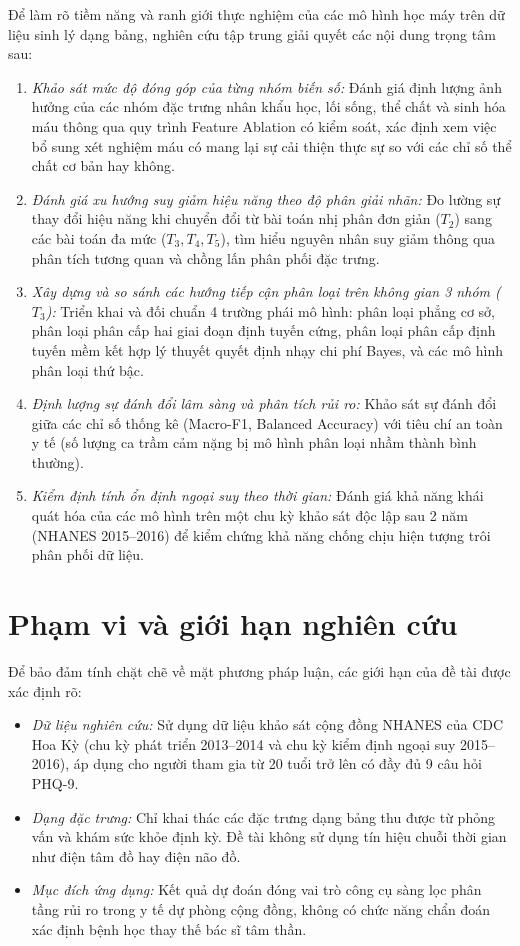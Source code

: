 Để làm rõ tiềm năng và ranh giới thực nghiệm của các mô hình học máy trên dữ liệu sinh lý dạng bảng, nghiên cứu tập trung giải quyết các nội dung trọng tâm sau:
\begin{enumerate}
    \item \textit{Khảo sát mức độ đóng góp của từng nhóm biến số:} Đánh giá định lượng ảnh hưởng của các nhóm đặc trưng nhân khẩu học, lối sống, thể chất và sinh hóa máu thông qua quy trình Feature Ablation có kiểm soát, xác định xem việc bổ sung xét nghiệm máu có mang lại sự cải thiện thực sự so với các chỉ số thể chất cơ bản hay không.
    \item \textit{Đánh giá xu hướng suy giảm hiệu năng theo độ phân giải nhãn:} Đo lường sự thay đổi hiệu năng khi chuyển đổi từ bài toán nhị phân đơn giản ($T_2$) sang các bài toán đa mức ($T_3, T_4, T_5$), tìm hiểu nguyên nhân suy giảm thông qua phân tích tương quan và chồng lấn phân phối đặc trưng.
    \item \textit{Xây dựng và so sánh các hướng tiếp cận phân loại trên không gian 3 nhóm ($T_3$):} Triển khai và đối chuẩn 4 trường phái mô hình: phân loại phẳng cơ sở, phân loại phân cấp hai giai đoạn định tuyến cứng, phân loại phân cấp định tuyến mềm kết hợp lý thuyết quyết định nhạy chi phí Bayes, và các mô hình phân loại thứ bậc.
    \item \textit{Định lượng sự đánh đổi lâm sàng và phân tích rủi ro:} Khảo sát sự đánh đổi giữa các chỉ số thống kê (Macro-F1, Balanced Accuracy) với tiêu chí an toàn y tế (số lượng ca trầm cảm nặng bị mô hình phân loại nhầm thành bình thường).
    \item \textit{Kiểm định tính ổn định ngoại suy theo thời gian:} Đánh giá khả năng khái quát hóa của các mô hình trên một chu kỳ khảo sát độc lập sau 2 năm (NHANES 2015--2016) để kiểm chứng khả năng chống chịu hiện tượng trôi phân phối dữ liệu.
\end{enumerate}

\section{Phạm vi và giới hạn nghiên cứu}
\label{sec:pham-vi-nghien-cuu}

Để bảo đảm tính chặt chẽ về mặt phương pháp luận, các giới hạn của đề tài được xác định rõ:
\begin{itemize}
    \item \textit{Dữ liệu nghiên cứu:} Sử dụng dữ liệu khảo sát cộng đồng NHANES của CDC Hoa Kỳ (chu kỳ phát triển 2013--2014 và chu kỳ kiểm định ngoại suy 2015--2016), áp dụng cho người tham gia từ 20 tuổi trở lên có đầy đủ 9 câu hỏi PHQ-9.
    \item \textit{Dạng đặc trưng:} Chỉ khai thác các đặc trưng dạng bảng thu được từ phỏng vấn và khám sức khỏe định kỳ. Đề tài không sử dụng tín hiệu chuỗi thời gian như điện tâm đồ hay điện não đồ.
    \item \textit{Mục đích ứng dụng:} Kết quả dự đoán đóng vai trò công cụ sàng lọc phân tầng rủi ro trong y tế dự phòng cộng đồng, không có chức năng chẩn đoán xác định bệnh học thay thế bác sĩ tâm thần.
\end{itemize}

